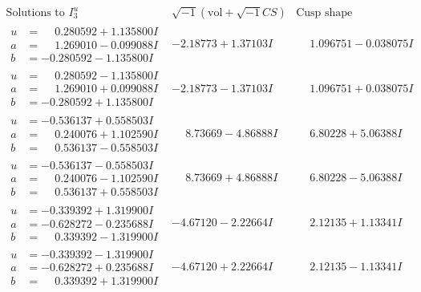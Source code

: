 \documentclass[1p]{elsarticle_modified}
\theoremstyle{definition}
\newcommand{\I}{\sqrt{-1}}
\begin{document}
$$\begin{array}{c|c|c}  
\text{Solutions to }I^u_{3}& \I (\text{vol} + \sqrt{-1}CS) & \text{Cusp shape}\\
 \hline 
\begin{aligned}
u &= \phantom{-}0.280592 + 1.135800 I \\
a &= \phantom{-}1.269010 - 0.099088 I \\
b &= -0.280592 - 1.135800 I\end{aligned}
 & -2.18773 + 1.37103 I & \phantom{-}1.096751 - 0.038075 I \\ \hline\begin{aligned}
u &= \phantom{-}0.280592 - 1.135800 I \\
a &= \phantom{-}1.269010 + 0.099088 I \\
b &= -0.280592 + 1.135800 I\end{aligned}
 & -2.18773 - 1.37103 I & \phantom{-}1.096751 + 0.038075 I \\ \hline\begin{aligned}
u &= -0.536137 + 0.558503 I \\
a &= \phantom{-}0.240076 + 1.102590 I \\
b &= \phantom{-}0.536137 - 0.558503 I\end{aligned}
 & \phantom{-}8.73669 - 4.86888 I & \phantom{-}6.80228 + 5.06388 I \\ \hline\begin{aligned}
u &= -0.536137 - 0.558503 I \\
a &= \phantom{-}0.240076 - 1.102590 I \\
b &= \phantom{-}0.536137 + 0.558503 I\end{aligned}
 & \phantom{-}8.73669 + 4.86888 I & \phantom{-}6.80228 - 5.06388 I \\ \hline\begin{aligned}
u &= -0.339392 + 1.319900 I \\
a &= -0.628272 - 0.235688 I \\
b &= \phantom{-}0.339392 - 1.319900 I\end{aligned}
 & -4.67120 - 2.22664 I & \phantom{-}2.12135 + 1.13341 I \\ \hline\begin{aligned}
u &= -0.339392 - 1.319900 I \\
a &= -0.628272 + 0.235688 I \\
b &= \phantom{-}0.339392 + 1.319900 I\end{aligned}
 & -4.67120 + 2.22664 I & \phantom{-}2.12135 - 1.13341 I \\ \hline\begin{aligned}

\end{aligned}
\end{array}$$
\end{document}
